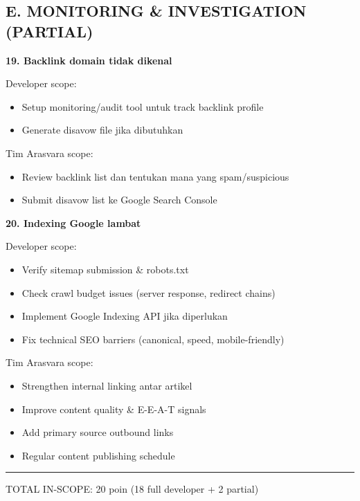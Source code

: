 \documentclass[12pt,a4paper]{article}
\begin{document}
\subsection*{E. MONITORING \& INVESTIGATION (PARTIAL)}

\textbf{19. Backlink domain tidak dikenal}

Developer scope:
\begin{itemize}[topsep=0pt, partopsep=0pt, itemsep=2pt]
    \item Setup monitoring/audit tool untuk track backlink profile
    \item Generate disavow file jika dibutuhkan
\end{itemize}

Tim Arasvara scope:
\begin{itemize}[topsep=0pt, partopsep=0pt, itemsep=2pt]
    \item Review backlink list dan tentukan mana yang spam/suspicious
    \item Submit disavow list ke Google Search Console
\end{itemize}

\textbf{20. Indexing Google lambat}

Developer scope:
\begin{itemize}[topsep=0pt, partopsep=0pt, itemsep=2pt]
    \item Verify sitemap submission \& robots.txt
    \item Check crawl budget issues (server response, redirect chains)
    \item Implement Google Indexing API jika diperlukan
    \item Fix technical SEO barriers (canonical, speed, mobile-friendly)
\end{itemize}

Tim Arasvara scope:
\begin{itemize}[topsep=0pt, partopsep=0pt, itemsep=2pt]
    \item Strengthen internal linking antar artikel
    \item Improve content quality \& E-E-A-T signals
    \item Add primary source outbound links
    \item Regular content publishing schedule
\end{itemize}

\vspace{12pt}
\hrule
\vspace{12pt}

TOTAL IN-SCOPE: 20 poin (18 full developer + 2 partial)
\end{document}

